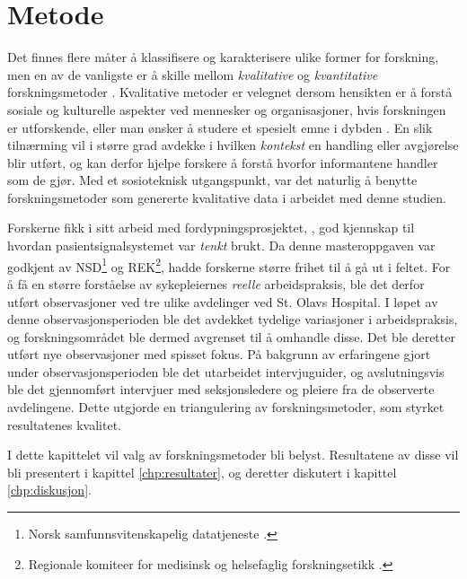 \chapter{Metode}
\label{chp:metode} 

Det finnes flere måter å klassifisere og karakterisere ulike former for forskning, men en av de vanligste er å skille mellom \textit{kvalitative} og \textit{kvantitative} forskningsmetoder \citep{Myers13, Tjora}. Kvalitative metoder er velegnet dersom hensikten er å forstå sosiale og kulturelle aspekter ved mennesker og organisasjoner, hvis forskningen er utforskende, eller man ønsker å studere et spesielt emne i dybden \citep{Myers13}. En slik tilnærming vil i større grad avdekke i hvilken \textit{kontekst} en handling eller avgjørelse blir utført, og kan derfor hjelpe forskere å forstå hvorfor informantene handler som de gjør. Med et sosioteknisk utgangspunkt, var det naturlig å benytte forskningsmetoder som genererte kvalitative data i arbeidet med denne studien.

\noindent
Forskerne fikk i sitt arbeid med fordypningsprosjektet, \citet{Sund13}, god kjennskap til hvordan pasientsignalsystemet var \textit{tenkt} brukt. Da denne masteroppgaven var godkjent av NSD\footnote{Norsk samfunnsvitenskapelig datatjeneste \citep{NSD}.} og REK\footnote{Regionale komiteer for medisinsk og helsefaglig forskningsetikk \citep{REK}.}, hadde forskerne større frihet til å gå ut i feltet. For å få en større forståelse av sykepleiernes \textit{reelle} arbeidspraksis, ble det derfor utført observasjoner ved tre ulike avdelinger ved St. Olavs Hospital. I løpet av denne observasjonsperioden ble det avdekket tydelige variasjoner i arbeidspraksis, og forskningsområdet ble dermed avgrenset til å omhandle disse. Det ble deretter utført nye observasjoner med spisset fokus. På bakgrunn av erfaringene gjort under observasjonsperioden ble det utarbeidet intervjuguider, og avslutningsvis ble det gjennomført intervjuer med seksjonsledere og pleiere fra de observerte avdelingene. Dette utgjorde en triangulering av forskningsmetoder, som styrket resultatenes kvalitet.

\noindent
I dette kapittelet vil valg av forskningsmetoder bli belyst. Resultatene av disse vil bli presentert i kapittel \ref{chp:resultater}, og deretter diskutert i kapittel \ref{chp:diskusjon}. 





